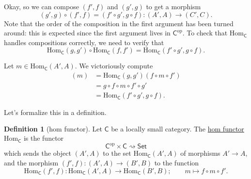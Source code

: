 \documentclass[a4paper,10pt]{scrreprt}
\newcommand{\defn}[1]{\ul{#1}}
\newcommand{\Hom}{\mathrm{Hom}}
\theoremstyle{definition}
\newtheorem{definition}{Definition}[section]
\theoremstyle{plain}
\theoremstyle{remark}
\begin{document}
Okay, so we can compose $(f', f)$ and $(g', g)$ to get a morphism 
\begin{equation*}
  (g', g) \circ (f', f) = (f' \circ g', g \circ f)\colon (A', A) \to (C', C).
\end{equation*}
Note that the order of the composition in the first argument has been turned around: this is expected since the first argument lives in $\mathsf{C}^{\mathrm{op}}$. To check that $\Hom_{\mathsf{C}}$ handles compositions correctly, we need to verify that 
\begin{equation*}
  \Hom_{\mathsf{C}}(g, g') \circ \Hom_{\mathsf{C}}(f, f') = \Hom_{\mathsf{C}}(f' \circ g', g \circ f).
\end{equation*}

Let $m \in \Hom_{\mathsf{C}}(A', A)$. We victoriously compute
\begin{align*}
  [\Hom_{\mathsf{C}}(g, g') \circ \Hom_{\mathsf{C}}(f, f')](m) &= \Hom_{\mathsf{C}}(g, g')(f \circ m \circ f') \\
  &= g \circ f \circ m \circ f' \circ g' \\
  &= \Hom_{\mathsf{C}}(f' \circ g', g \circ f).
\end{align*}

Let's formalize this in a definition.
\begin{definition}[hom functor]
  \label{def:homfunctor}
  Let $\mathsf{C}$ be a locally small category. The \defn{hom functor} $\Hom_{\mathsf{C}}$ is the functor 
  \begin{equation*}
    \mathsf{C}^{\mathrm{op}} \times \mathsf{C} \rightsquigarrow \mathsf{Set}
  \end{equation*}
  which sends the object $(A', A)$ to the set $\Hom_{\mathsf{C}}(A', A)$ of morphisms $A' \to A$, and the morphism $(f', f)\colon (A', A) \to (B', B)$ to the function
  \begin{equation*}
    \Hom_{\mathsf{C}}(f', f)\colon \Hom_{\mathsf{C}}(A', A) \to \Hom_{\mathsf{C}}(B', B);\qquad m \mapsto f \circ m \circ f'.
  \end{equation*}
\end{definition}
\end{document}
